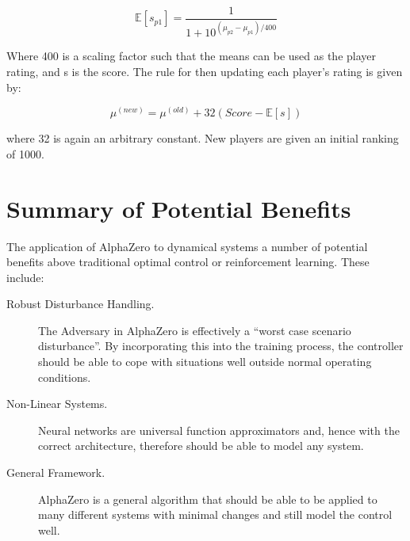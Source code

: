 \documentclass[../main.tex]{subfiles}
\begin{document}
\begin{equation}
   \label{equ:elo}
   \mathbb{E}[s_{p1}] = \frac{1}{1+10^{(\mu_{p2} - \mu_{p1})/400}}
\end{equation}

Where 400 is a scaling factor such that the means can be used as the player rating, and s is the score. The rule for then updating each player's rating is given by:

\begin{equation}
   \mu^{(new)} = \mu^{(old)} + 32(Score - \mathbb{E}[s])
\end{equation}

where 32 is again an arbitrary constant. New players are given an initial ranking of 1000.

\section{Summary of Potential Benefits}

The application of AlphaZero to dynamical systems a number of potential benefits above traditional optimal control or reinforcement learning. These include:
\begin{description}
    \item[Robust Disturbance Handling.] The Adversary in AlphaZero is effectively a ``worst case scenario disturbance''. By incorporating this into the training process, the controller should be able to cope with situations well outside normal operating conditions.
    \item[Non-Linear Systems.] Neural networks are universal function approximators and, hence with the correct architecture, therefore should be able to model any system.
    \item[General Framework.] AlphaZero is a general algorithm that should be able to be applied to many different systems with minimal changes and still model the control well. 
\end{description}

\onlyinsubfile{}
\end{document}
